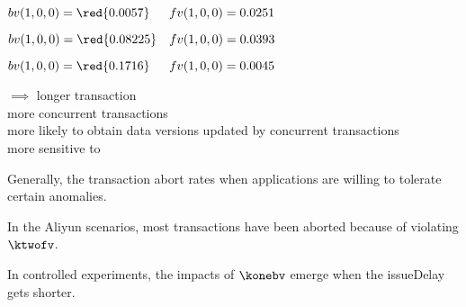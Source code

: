 \begin{frame}{}
  \begin{description}[issueDelay = 20ms:]
    \setlength{\itemsep}{10pt}
    \item[issueDelay = 20ms:] $bv(1,0,0) = \red{0.0057} \quad\;\; fv(1,0,0) = 0.0251$
    \item[issueDelay = 15ms:] $bv(1,0,0) = \red{0.08225} \quad fv(1,0,0) = 0.0393$
    \item[issueDelay = 5ms:] $bv(1,0,0) = \red{0.1716} \quad\;\; fv(1,0,0) = 0.0045$
  \end{description}

  \pause
  \vspace{0.50cm}
  \begin{center}
     $\implies$ longer transaction \\[5pt]
    more concurrent transactions \\[5pt]
    more likely to obtain data versions updated by concurrent transactions \\[5pt]
    more sensitive to \blue{$\ktwofv$}
  \end{center}
\end{frame}

\begin{frame}{}
  Generally, \rvsi{}  the transaction abort rates 
  when applications are willing to tolerate certain anomalies.

  \pause
  \vspace{0.6cm}
  \begin{description}[<+->]
    \setlength{\itemsep}{5pt}
    \item[$\ktwofv$:] In the Aliyun scenarios, most transactions have been aborted because of violating $\ktwofv$.
    \item[$\konebv$:] In controlled experiments, the impacts of $\konebv$ emerge when the issueDelay gets shorter.
    \item[$\kthreesv$:] 
  \end{description}
\end{frame}
